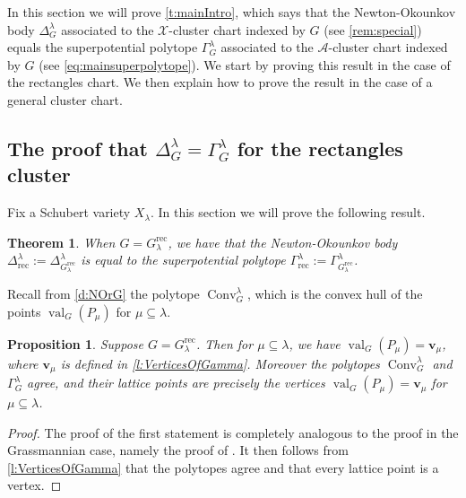 \documentclass{amsart}
\newtheorem{theorem}[thm]{Theorem}
\newtheorem{proposition}[thm]{Proposition}
\theoremstyle{definition}
\numberwithin{equation}{section}
\newcommand{\conv}{\operatorname{Conv}}
\newcommand{\Q}{\Gamma}
\newcommand{\rect}{\mathrm{rec}}
\newcommand{\val}{{\operatorname{val}}}
\begin{document}
In this section we will prove \cref{t:mainIntro}, which says 
that the Newton-Okounkov body $\Delta^{\lambda}_G$
associated to the $\mathcal{X}$-cluster chart indexed by $G$
(see \cref{rem:special}) 
equals the superpotential polytope $\Gamma^{\lambda}_G$
associated to the $\mathcal{A}$-cluster chart indexed by $G$
(see \eqref{eq:mainsuperpolytope}).
We start by proving this result in the case of the 
rectangles chart.  We then explain how to prove the result 
in the case of a general
cluster chart.

\subsection{The proof that $\Delta^{\lambda}_G=\Gamma^{\lambda}_G$ for the rectangles cluster}\label{s:proof}




Fix a Schubert variety $X_{\lambda}$.
In this section we will prove the following result.

\begin{theorem}\label{thm:rectanglesproof}
When $G = G_{\lambda}^{\rect}$, we have
that the Newton-Okounkov body 
$\Delta^{\lambda}_{\rect}:=\Delta^{\lambda}_{G_{\lambda}^{\rect}}$ is 
equal to 
the superpotential polytope
$\Gamma^{\lambda}_{\rect}:=\Gamma^{\lambda}_{G_{\lambda}^{\rect}}$. 
\end{theorem}


Recall 
from \cref{d:NOrG}
the polytope 
$\conv_G^{\lambda}$, 
which is the convex hull of the points
$\val_G(P_\mu)$ for $\mu\subseteq\lambda$. 


\begin{proposition}\label{c:ConvEqualsGamma}
Suppose 
$G=G^\rect_{\lambda}$. 
Then for $\mu \subseteq \lambda$, we have 
	$\val_G(P_\mu)=\mathbf v_\mu$, where
	$\mathbf v_{\mu}$ is defined in \cref{l:VerticesOfGamma}.
Moreover the polytopes $\conv_G^{\lambda}$ and $\Q^\lambda_{G}$ agree, and their 
lattice points are precisely the vertices 
	$\val_G(P_\mu)=\mathbf v_\mu$ for $\mu \subseteq \lambda$.
\end{proposition}

\begin{proof} The proof of the first statement is 
completely analogous to the proof in the Grassmannian case,
namely the proof of  \cite[Proposition 14.4]{RW}. 
It then follows from \cref{l:VerticesOfGamma} that the polytopes agree
and that every lattice point is a vertex. 
\end{proof}
\end{document}
